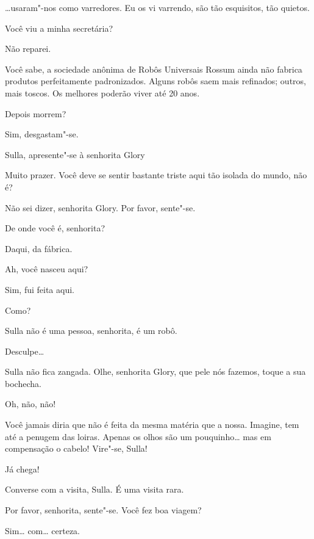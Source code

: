  \ldots{}usaram"-nos como varredores. Eu os vi varrendo, são tão esquisitos,
tão quietos.

 Você viu a minha secretária?

 Não reparei.

  Você sabe, a sociedade anônima de Robôs
Universais Rossum ainda não fabrica produtos perfeitamente padronizados. Alguns robôs saem mais
refinados; outros, mais toscos. Os melhores poderão viver até 20 anos.

 Depois morrem?

 Sim, desgastam"-se.

 Sulla, apresente"-se à senhorita Glory

  Muito prazer. Você deve se sentir
bastante triste aqui tão isolada do mundo, não é?

 Não sei dizer, senhorita Glory. Por favor, sente"-se.

  De onde você é, senhorita?

 Daqui, da fábrica.

 Ah, você nasceu aqui?

 Sim, fui feita aqui.

  Como?

  Sulla não é uma pessoa, senhorita, é um robô.

 Desculpe\ldots{}

  Sulla não fica zangada. Olhe,
senhorita Glory, que pele nós fazemos, toque a sua bochecha.

 Oh, não, não!

 Você jamais diria que não é feita da mesma matéria que a nossa.
Imagine, tem até a penugem das loiras. Apenas os olhos são um pouquinho\ldots{} mas em compensação
o cabelo! Vire"-se, Sulla!

 Já chega!

 Converse com a visita, Sulla. É uma visita rara.

 Por favor, senhorita, sente"-se.  Você fez 
boa viagem?

 Sim\ldots{} com\ldots{} certeza.

